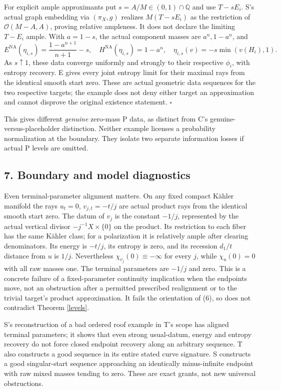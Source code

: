 \documentclass[
  11pt,
]{article}
\begin{document}
For explicit ample approximants put \(s=A/M\in(0,1)\cap\mathbb Q\) and
use \(T-sE_i\). S's actual graph embedding via \((\pi_X,g)\) realizes
\(M(T-sE_i)\) as the restriction of \(\mathcal O(M-A,A)\), proving
relative ampleness. It does not declare the limiting \(T-E_i\) ample.
With \(a=1-s\), the actual component masses are \(a^n,1-a^n\), and \[
E^{\mathrm{NA}}(\eta_{i,s})=\frac{1-a^{n+1}}{n+1}-s,
\quad H^{\mathrm{NA}}(\eta_{i,s})=1-a^n,
\quad\eta_{i,s}(v)=-s\min(v(H_i),1).                    \tag{20}
\] As \(s\uparrow1\), these data converge uniformly and strongly to
their respective \(\phi_i\), with entropy recovery. E gives every joint
entropy limit for their maximal rays from the identical smooth start
zero. These are actual geometric data sequences for the two respective
targets; the example does not deny either target an approximation and
cannot disprove the original existence statement. \(\square\)

This gives different \emph{genuine} zero-mass P data, as distinct from
C's genuine-versus-placeholder distinction. Neither example licenses a
probability normalization at the boundary. They isolate two separate
information losses if actual P levels are omitted.

\subsection{7. Boundary and model
diagnostics}\label{boundary-and-model-diagnostics}

Even terminal-parameter alignment matters. On any fixed compact Kähler
manifold the rays \(u_t=0\), \(v_{j,t}=-t/j\) are actual product rays
from the identical smooth start zero. The datum of \(v_j\) is the
constant \(-1/j\), represented by the actual vertical divisor
\(-j^{-1}X\times\{0\}\) on the product. Its restriction to each fiber
has the same Kähler class; for a polarization it is relatively ample
after clearing denominators. Its energy is \(-t/j\), its entropy is
zero, and its recession \(d_1/t\) distance from \(u\) is \(1/j\).
Nevertheless \(\chi_{v_j}(0)\equiv-\infty\) for every \(j\), while
\(\chi_u(0)=0\) with all raw masses one. The terminal parameters are
\(-1/j\) and zero. This is a concrete failure of a fixed-parameter
continuity implication when the endpoints move, not an obstruction after
a permitted prescribed realignment or to the trivial target's product
approximation. It fails the orientation of (6), so does not contradict
Theorem \ref{levels}.

S's reconstruction of a bad ordered roof example in T's scope has
aligned terminal parameters; it shows that even strong usual-datum,
energy and entropy recovery do not force closed endpoint recovery along
an arbitrary sequence. T also constructs a good sequence in its entire
stated curve signature. S constructs a good singular-start sequence
approaching an identically minus-infinite endpoint with raw mixed masses
tending to zero. These are exact grants, not new universal obstructions.
\end{document}
